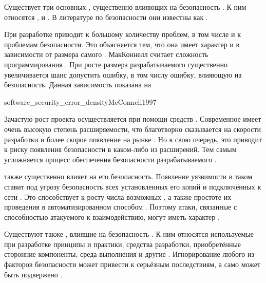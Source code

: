 %
Существует три основных , существенно влияющих на безопасность . 
%
К ним относятся ,  и  .
%
В литературе по безопасности они известны как  .

%
При разработке   приводит к большому количеству проблем, в том числе и к проблемам безопасности.
%
Это объясняется тем, что она имеет характер  и  в зависимости от размера самого  .
%
МакКоннелл считает сложность  программирования .
%
При росте размера разрабатываемого  существенно увеличивается шанс допустить ошибку, в том числу ошибку, влияющую на безопасность.
%
Данная зависимость показана на 

	{software_security_error_density}{McConnell1997}

%
Зачастую рост проекта осуществляется при помощи средств . 
%
Современное  имеет очень высокую степень расширяемости, что благотворно сказывается на скорости разработки и более скорое появление на рынке .
%
Но в свою очередь, это приводит к риску появления  безопасности в каком-либо из расширений.
%
Тем самым усложняется процесс обеспечения безопасности разрабатываемого .

%
 также существенно влияет на его безопасность.
%
Появление уязвимости в таком  ставит под угрозу безопасность всех установленных его копий и подключённых к сети  . 
%
Это способствует к росту числа возможных , а также простоте их проведения в автоматизированном способом .
%
Поэтому атаки, связанные с способностью атакуемого  к взаимодействию, могут иметь характер .

%
Существуют также , влиящие на безопасность .
%
К ним относятся используемые при разработке принципы и практики, средства разработки, приобретённые сторонние компоненты, среда выполнения и другие .
%
Игнорирование любого из факторов безопасности может привести к серьёзным последствиям, а само  может быть подвержено .